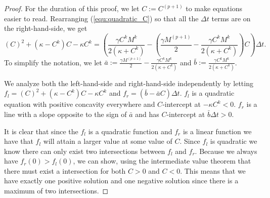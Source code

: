 \begin{proof}
  For the duration of this proof, we let $C := C^{(p+1)}$ to make equations easier to read.
  Rearranging (\ref{equ:quadratic_C}) so that all the $\Delta t$ terms are on the right-hand-side, we get
  \begin{equation}
    \left( C \right)^2 + \left(\kappa - C^{k}\right)C - \kappa C^{k} =  \left(\frac{\gamma C^k M^k}{2\left(\kappa + C^k\right)} - \left(\frac{\gamma M^{(p+1)}}{2} - \frac{\gamma C^k M^k}{2 \left(\kappa + C^k\right)} \right)C \right) \Delta t.
  \end{equation}
  To simplify the notation, we let $\bar{a} := \frac{\gamma M^{(p+1)}}{2} - \frac{\gamma C^k M^k}{2\left(\kappa + C^k\right)}$ and $\bar{b} := \frac{\gamma C^k M^k}{2\left(\kappa + C^k\right)}$.
  
  We analyze both the left-hand-side and right-hand-side independently by letting $f_l = \left( C \right)^2 + \left(\kappa - C^{k}\right)C - \kappa C^{k}$ and $f_r =  \left(\bar{b} - \bar{a} C \right) \Delta t$.
  $f_l$ is a quadratic equation with positive concavity everywhere and $C$-intercept at $-\kappa C^{k} < 0$.
  $f_r$ is a line with a slope opposite to the sign of $\bar{a}$ and has $C$-intercept at $\bar{b}\Delta t > 0$.
  
  It is clear that since the $f_l$ is a quadratic function and $f_r$ is a linear function we have that $f_l$ will attain a larger value at some value of $C$. 
  Since $f_l$ is quadratic we know there can only exist two intersections between $f_l$ and $f_r$.
  Because we always have $f_r(0) > f_l(0)$, we can show, using the intermediate value theorem that there must exist a intersection for both $C >0$ and $C < 0$.
  This means that we have exactly one positive solution and one negative solution since there is a maximum of two intersections.
\end{proof}

